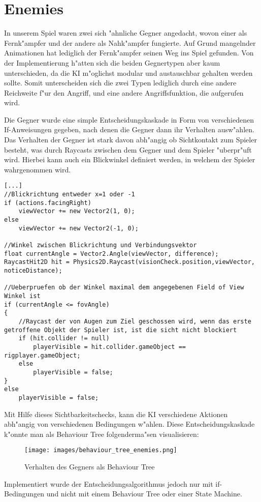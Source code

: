 \chapter{Enemies}
In unserem Spiel waren zwei sich "ahnliche Gegner angedacht, wovon einer als Fernk"ampfer und der andere als Nahk"ampfer fungierte. Auf Grund mangelnder Animationen hat lediglich der Fernk"ampfer seinen Weg ins Spiel gefunden. Von der Implementierung h"atten sich die beiden Gegnertypen aber kaum unterschieden, da die KI m"oglichst modular und austauschbar gehalten werden sollte. Somit unterscheiden sich die zwei Typen lediglich durch eine andere Reichweite f"ur den Angriff, und eine andere Angriffsfunktion, die aufgerufen wird.\newline

Die Gegner wurde eine simple Entscheidungskaskade in Form von verschiedenen If-Anweisungen gegeben, nach denen die Gegner dann ihr Verhalten ausw"ahlen. Das Verhalten der Gegner ist stark davon abh"angig ob Sichtkontakt zum Spieler besteht, was durch Raycasts zwischen dem Gegner und dem Spieler "uberpr"uft wird.  Hierbei kann auch ein Blickwinkel definiert werden, in welchem der Spieler wahrgenommen wird.

\begin{lstlisting}[breaklines=true]
[...]
//Blickrichtung entweder x=1 oder -1
if (actions.facingRight)
    viewVector += new Vector2(1, 0);
else
    viewVector += new Vector2(-1, 0);

//Winkel zwischen Blickrichtung und Verbindungsvektor
float currentAngle = Vector2.Angle(viewVector, difference);
RaycastHit2D hit = Physics2D.Raycast(visionCheck.position,viewVector, noticeDistance);

//Ueberpruefen ob der Winkel maximal dem angegebenen Field of View Winkel ist
if (currentAngle <= fovAngle)
{
    //Raycast der von Augen zum Ziel geschossen wird, wenn das erste getroffene Objekt der Spieler ist, ist die sicht nicht blockiert
    if (hit.collider != null)
        playerVisible = hit.collider.gameObject == rigplayer.gameObject;
	else
		playerVisible = false;
}
else
	playerVisible = false;

\end{lstlisting}

Mit Hilfe dieses Sichtbarkeitschecks, kann die KI verschiedene Aktionen abh"angig von verschiedenen Bedingungen w"ahlen.
Diese Entscheidungskaskade k"onnte man als Behaviour Tree folgenderma"sen visualisieren:

\begin{figure}
	\centering
	\texttt{[image: images/behaviour\_tree\_enemies.png]}
	\caption{Verhalten des Gegners als Behaviour Tree}
	\label{fig:screen_pre}
\end{figure}

Implementiert wurde der Entscheidungsalgorithmus jedoch nur mit if-Bedingungen und nicht mit einem Behaviour Tree oder einer State Machine.

